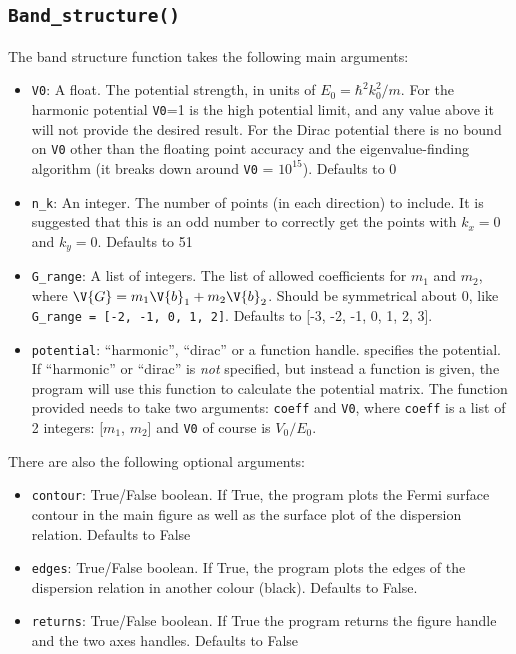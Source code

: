\documentclass[a4paper,11pt]{article}
\numberwithin{equation}{section}
\begin{document}
	\subsection{\texorpdfstring{\texttt{Band\_structure()}}{Band Structure}}
	The band structure function takes the following main arguments:
	\begin{itemize}
		\item \texttt{V0}: A float. The potential strength, in units of $ E_0 = \hbar^2 k_0^2/m $. For the harmonic potential \texttt{V0}=1 is the high potential limit, and any value above it will not provide the desired result. For the Dirac potential there is no bound on \texttt{V0} other than the floating point accuracy and the eigenvalue-finding algorithm (it breaks down around \texttt{V0} = $ 10^{15} $). Defaults to 0
		\item \texttt{n\_k}: An integer. The number of points (in each direction) to include. It is suggested that this is an odd number to correctly get the points with $ k_x = 0 $ and $ k_y = 0 $. Defaults to 51
		\item \texttt{G\_range}: A list of integers. The list of allowed coefficients for $ m_1 $ and $ m_2 $, where $ \V{G} = m_1 \V{b}_1 + m_2 \V{b}_2 $. Should be symmetrical about 0, like \texttt{G\_range = [-2, -1, 0, 1, 2]}. Defaults to [-3, -2, -1, 0, 1, 2, 3].
		\item \texttt{potential}: ``harmonic'', ``dirac'' or a function handle. specifies the potential. If ``harmonic'' or ``dirac'' is \textit{not} specified, but instead a function is given, the program will use this function to calculate the potential matrix. The function provided needs to take two arguments: \texttt{coeff} and \texttt{V0}, where \texttt{coeff} is a list of 2 integers: [$ m_1 $, $ m_2 $] and \texttt{V0} of course is $ V_0/E_0 $.
	\end{itemize}
	There are also the following optional arguments:
	\begin{itemize}
		\item \texttt{contour}: True/False boolean. If True, the program plots the Fermi surface contour in the main figure as well as the surface plot of the dispersion relation. Defaults to False
		\item \texttt{edges}: True/False boolean. If True, the program plots the edges of the dispersion relation in another colour (black). Defaults to False.
		\item \texttt{returns}: True/False boolean. If True the program returns the figure handle and the two axes handles. Defaults to False
	\end{itemize}
\end{document}
